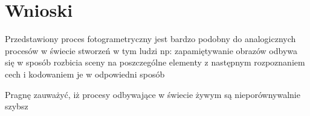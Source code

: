 \chapter{Wnioski}


Przedstawiony proces fotogrametryczny jest bardzo podobny do analogicznych procesów w świecie stworzeń w tym ludzi
np: zapamiętywanie obrazów odbywa się w sposób rozbicia sceny na poszczególne elementy z następnym rozpoznaniem cech i kodowaniem je w odpowiedni sposób

Pragnę zauważyć, iż procesy odbywające w świecie żywym są nieporównywalnie szybsz
